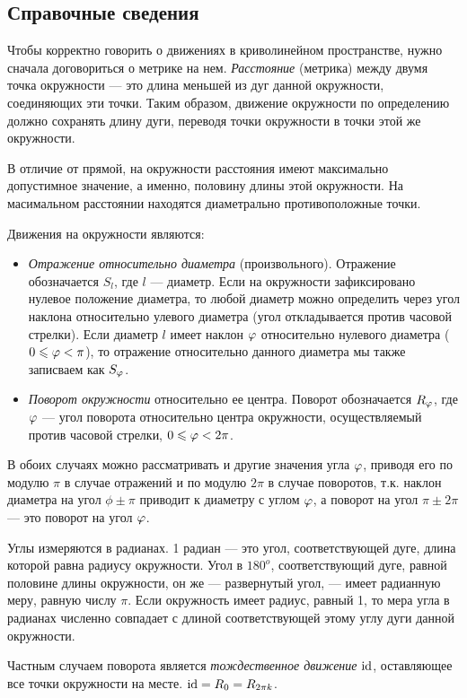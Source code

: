 \subsection*{Справочные сведения}

Чтобы корректно говорить о движениях в криволинейном пространстве, нужно сначала договориться о метрике на нем. \textit{Расстояние} (метрика) между двумя точка окружности --- это длина меньшей из дуг данной окружности, соединяющих эти точки. Таким образом, движение окружности по определению должно сохранять длину дуги, переводя точки окружности в точки этой же окружности.

В отличие от прямой, на окружности расстояния имеют максимально допустимное значение, а именно, половину длины этой окружности. На масимальном расстоянии находятся диаметрально противоположные точки.

Движения на окружности являются:
\begin{itemize}
\item \textit{Отражение относительно диаметра} (произвольного). Отражение обозначается $S_l$, где $l$ --- диаметр. Если на окружности зафиксировано нулевое положение диаметра, то любой диаметр можно определить через угол наклона относительно улевого диаметра (угол откладывается против часовой стрелки). Если диаметр $l$ имеет наклон $\varphi$ относительно нулевого диаметра ($0\leqslant\varphi<\pi$), то отражение относительно данного диаметра мы также записваем как $S_\varphi$.
\item \textit{Поворот окружности} относительно ее центра. Поворот обозначается $R_\varphi$, где $\varphi$ --- угол поворота относительно центра окружности, осуществляемый против часовой стрелки, $0\leqslant\varphi<2\pi$.
\end{itemize}
В обоих случаях можно рассматривать и другие значения угла $\varphi$, приводя его по модулю $\pi$ в случае отражений и по модулю $2\pi$ в случае поворотов, т.к. наклон диаметра на угол $\phi\pm\pi$ приводит к диаметру с углом $\varphi$, а поворот на угол $\pi\pm2\pi$ --- это поворот на угол $\varphi$.

Углы измеряются в радианах. 1 радиан --- это угол, соответствующей дуге, длина которой равна радиусу окружности. Угол в $180^o$, соответствующий дуге, равной половине длины окружности, он же --- развернутый угол, --- имеет радианную меру, равную числу $\pi$. Если окружность имеет радиус, равный 1, то мера угла в радианах численно совпадает с длиной соответствующей этому углу дуги данной окружности.

Частным случаем поворота является \textit{тождественное движение} $\mathrm{id}$, оставляющее все точки окружности на месте. $\mathrm{id}=R_0=R_{2\pi k}$.

